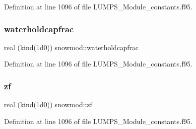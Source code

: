 Definition at line 1096 of file L\+U\+M\+P\+S\+\_\+\+Module\+\_\+constants.\+f95.

\mbox{\label{namespacesnowmod_a8cda7b30a924d03ee30f2bde6c9e41bc}} 
\subsubsection{\texorpdfstring{waterholdcapfrac}{waterholdcapfrac}}
{\footnotesize\ttfamily real (kind(1d0)) snowmod\+::waterholdcapfrac}



Definition at line 1096 of file L\+U\+M\+P\+S\+\_\+\+Module\+\_\+constants.\+f95.

\mbox{\label{namespacesnowmod_ab1cf232aa719c4c447ac11c210889e66}} 
\subsubsection{\texorpdfstring{zf}{zf}}
{\footnotesize\ttfamily real (kind(1d0)) snowmod\+::zf}



Definition at line 1096 of file L\+U\+M\+P\+S\+\_\+\+Module\+\_\+constants.\+f95.

